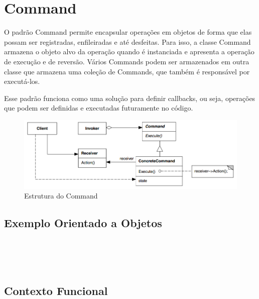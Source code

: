 \section{Command}

O padrão Command permite encapsular operações em objetos 
de forma que elas possam ser registradas, enfileiradas 
e até desfeitas. Para isso, a classe Command armazena o 
objeto alvo da operação quando é instanciada e apresenta 
a operação de execução e de reversão. Vários Commands 
podem ser armazenados em outra classe que armazena uma 
coleção de Commands, que também é responsável por 
executá-los.

Esse padrão funciona como uma solução para definir 
callbacks, ou seja, operações que podem ser definidas 
e executadas futuramente no código.

\begin{figure}[htb]
	\caption{\label{command_struct}Estrutura do Command}
	\begin{center}
	    \includegraphics[scale=0.4]{5_padroes-contexto-funcional/5.3_comportamentais/5.3.02_command/diagram.png}
	\end{center}
\end{figure}

\subsection*{Exemplo Orientado a Objetos}

\begin{lstlisting}[caption={Command Orientação a Objetos},label=oocommand]


    
\end{lstlisting}

\subsection*{Contexto Funcional}

